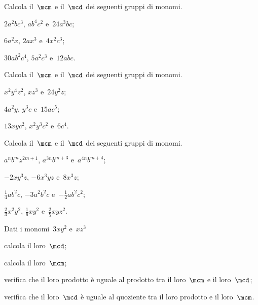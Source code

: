 \begin{esercizio}
 \label{ese:9.46}
Calcola il~$\mcm$ e il~$\mcd$ dei seguenti gruppi di monomi.

\begin{enumeratea}
 \item $2a^{2}bc^{3}$, $ab^{4}c^{2}$ e~$24a^{3}bc$;
 \item $6a^{2}x$, $2ax^{3}$ e~$4x^{2}c^{3}$;
 \item $30ab^{2}c^{4}$, $5a^{2}c^{3}$ e~$12abc$.
\end{enumeratea}
\end{esercizio}

\begin{esercizio}
 \label{ese:9.47}
Calcola il~$\mcm$ e il~$\mcd$ dei seguenti gruppi di monomi.

\begin{enumeratea}
 \item $x^{2}y^{4}z^{2}$, $xz^{3}$ e~$24y^{2}z$;
 \item $4a^{2}y$, $y^{3}c$ e~$15ac^{5}$;
 \item $13xyc^{2}$, $x^{2}y^{3}c^{2}$ e~$6c^{4}$.
\end{enumeratea}
\end{esercizio}

\begin{esercizio}[\Ast]
 \label{ese:9.48}
Calcola il~$\mcm$ e il~$\mcd$ dei seguenti gruppi di monomi.

\begin{enumeratea}
 \item $a^{n}b^{m}z^{2m+1}$, $a^{3n}b^{m+3}$ e~$a^{4n}b^{m+4}$;
 \item $-2xy^{3}z$, $-6x^{3}yz$ e~$8x^{3}z$;
 \item $\frac{1}{4}ab^{2}c$, $-3a^{2}b^{2}c$ e~$-{\frac{1}{2}}ab^{2}c^{2}$;
 \item $\frac{2}{3}x^{2}y^{2}$, $\frac{1}{6}xy^{2}$ e~$\frac{2}{5}xyz^{2}$.
\end{enumeratea}
\end{esercizio}

\begin{esercizio}
 \label{ese:9.49}
Dati i monomi~$3xy^{2}$ e~$xz^{3}$

\begin{enumeratea}
\item calcola il loro~$\mcd$;
\item calcola il loro~$\mcm$;
\item verifica che il loro prodotto è uguale al prodotto tra il loro~$\mcm$ e il loro~$\mcd$;
\item verifica che il loro~$\mcd$ è uguale al quoziente tra il loro prodotto e il loro~$\mcm$.
\end{enumeratea}
\end{esercizio}

